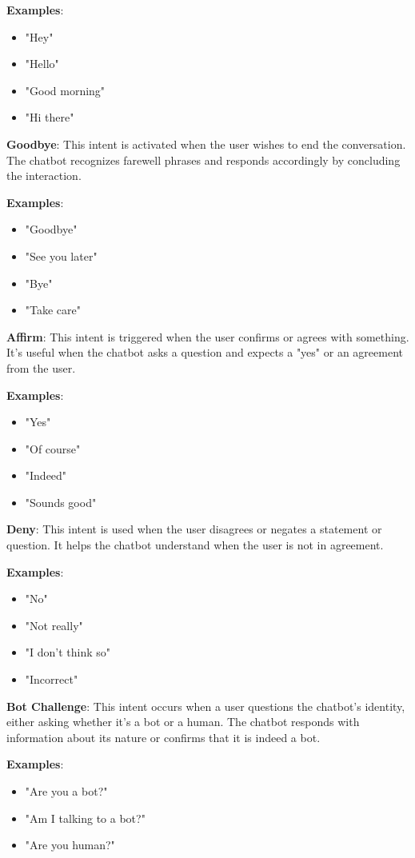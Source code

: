 \documentclass[a4paper,12pt]{article}
\begin{document}
\textbf{Examples}:
\begin{itemize}
    \item "Hey"
    \item "Hello"
    \item "Good morning"
    \item "Hi there"
\end{itemize}

\textbf{Goodbye}: This intent is activated when the user wishes to end the conversation. The chatbot recognizes farewell phrases and responds accordingly by concluding the interaction.

\textbf{Examples}:
\begin{itemize}
    \item "Goodbye"
    \item "See you later"
    \item "Bye"
    \item "Take care"
\end{itemize}

\textbf{Affirm}: This intent is triggered when the user confirms or agrees with something. It’s useful when the chatbot asks a question and expects a "yes" or an agreement from the user.

\textbf{Examples}:
\begin{itemize}
    \item "Yes"
    \item "Of course"
    \item "Indeed"
    \item "Sounds good"
\end{itemize}

\textbf{Deny}: This intent is used when the user disagrees or negates a statement or question. It helps the chatbot understand when the user is not in agreement.

\textbf{Examples}:
\begin{itemize}
    \item "No"
    \item "Not really"
    \item "I don't think so"
    \item "Incorrect"
\end{itemize}

\textbf{Bot Challenge}: This intent occurs when a user questions the chatbot’s identity, either asking whether it’s a bot or a human. The chatbot responds with information about its nature or confirms that it is indeed a bot.

\textbf{Examples}:
\begin{itemize}
    \item "Are you a bot?"
    \item "Am I talking to a bot?"
    \item "Are you human?"
\end{itemize}
\end{document}
